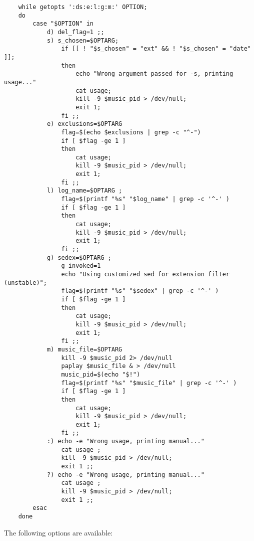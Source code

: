 \documentclass[12pt]{article}
\begin{document}
    \begin{verbatim}
    while getopts ':ds:e:l:g:m:' OPTION;
    do
        case "$OPTION" in
            d) del_flag=1 ;;
            s) s_chosen=$OPTARG;
                if [[ ! "$s_chosen" = "ext" && ! "$s_chosen" = "date" ]];
                then
                    echo "Wrong argument passed for -s, printing usage..."
                    cat usage;
                    kill -9 $music_pid > /dev/null;
                    exit 1;
                fi ;;
            e) exclusions=$OPTARG
                flag=$(echo $exclusions | grep -c "^-")
                if [ $flag -ge 1 ]
                then
                    cat usage;
                    kill -9 $music_pid > /dev/null;
                    exit 1;
                fi ;;
            l) log_name=$OPTARG ;
                flag=$(printf "%s" "$log_name" | grep -c '^-' )
                if [ $flag -ge 1 ]
                then
                    cat usage;
                    kill -9 $music_pid > /dev/null;
                    exit 1;
                fi ;;
            g) sedex=$OPTARG ;
                g_invoked=1
                echo "Using customized sed for extension filter (unstable)";
                flag=$(printf "%s" "$sedex" | grep -c '^-' )
                if [ $flag -ge 1 ]
                then
                    cat usage;
                    kill -9 $music_pid > /dev/null;
                    exit 1;
                fi ;;
            m) music_file=$OPTARG
                kill -9 $music_pid 2> /dev/null
                paplay $music_file & > /dev/null
                music_pid=$(echo "$!")
                flag=$(printf "%s" "$music_file" | grep -c '^-' )
                if [ $flag -ge 1 ]
                then
                    cat usage;
                    kill -9 $music_pid > /dev/null;
                    exit 1;
                fi ;;
            :) echo -e "Wrong usage, printing manual..."
                cat usage ;
                kill -9 $music_pid > /dev/null;
                exit 1 ;;
            ?) echo -e "Wrong usage, printing manual..."
                cat usage ;
                kill -9 $music_pid > /dev/null;
                exit 1 ;;
        esac
    done
    \end{verbatim}
    
    The following options are available:
    
\end{document}
